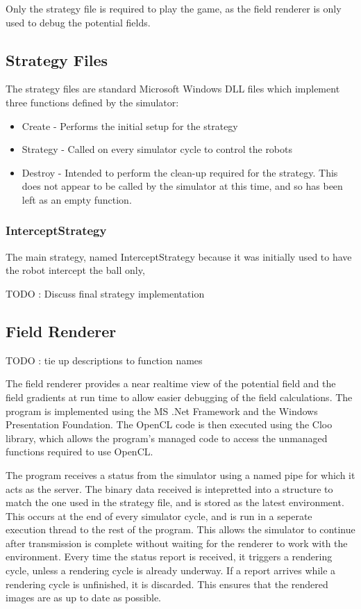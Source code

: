 \documentclass[10pt]{article} \usepackage[a4paper]{geometry}
\begin{document}
Only the strategy file is required to play the game, as the field renderer is
only used to debug the potential fields.

\subsection{Strategy Files}

The strategy files are standard Microsoft Windows \ac{DLL} files which
implement three functions defined by the simulator:
\begin{itemize}
\item Create - Performs the initial setup for the strategy
\item Strategy - Called on every simulator cycle to control the robots
\item Destroy - Intended to perform the clean-up required for the strategy.
This does not appear to be called by the simulator at this time, and so has been
 left as an empty function.
\end{itemize}

\subsubsection{InterceptStrategy}

The main strategy, named InterceptStrategy because it was initially used to have
the robot intercept the ball only, 

TODO : Discuss final strategy implementation

\subsection{Field Renderer}

TODO : tie up descriptions to function names

The field renderer provides a near realtime view of the potential field and the
field gradients at run time to allow easier debugging of the field calculations.
The program is implemented using the MS .Net Framework and the Windows
Presentation Foundation. The OpenCL code is then executed using the Cloo
library, which allows the program's managed code to access the unmanaged
functions required to use OpenCL.

The program receives a status from the simulator using a named pipe for which it
acts as the server. The binary data received is intepretted into a structure to
match the one used in the strategy file, and is stored as the latest
environment. This occurs at the end of every simulator cycle, and is run in a
seperate execution thread to the rest of the program. This allows the simulator
to continue after transmission is complete without waiting for the renderer to
work with the environment. Every time the status report is received, it triggers
a rendering cycle, unless a rendering cycle is already underway. If a report
arrives while a rendering cycle is unfinished, it is discarded. This ensures
that the rendered images are as up to date as possible.
\end{document}
